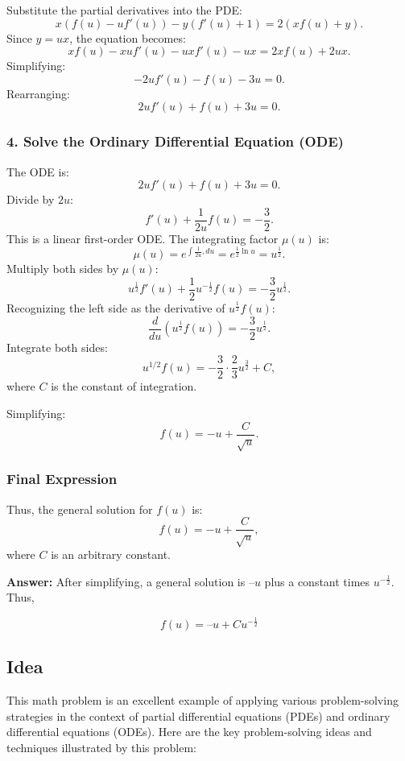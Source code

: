 \documentclass[a4paper,12pt]{book}
\begin{document}
Substitute the partial derivatives into the PDE:
\[
x \left( f(u) - u f'(u) \right) - y \left( f'(u) + 1 \right) = 2 \left( x f(u) + y \right).
\]
Since \( y = u x \), the equation becomes:
\[
x f(u) - x u f'(u) - u x f'(u) - u x = 2 x f(u) + 2 u x.
\]
Simplifying:
\[
-2u f'(u) - f(u) - 3u = 0.
\]
Rearranging:
\[
2u f'(u) + f(u) + 3u = 0.
\]

\subsubsection{4. Solve the Ordinary Differential Equation (ODE)}

The ODE is:
\[
2u f'(u) + f(u) + 3u = 0.
\]
Divide by \( 2u \):
\[
f'(u) + \frac{1}{2u} f(u) = -\frac{3}{2}.
\]
This is a linear first-order ODE. The integrating factor \( \mu(u) \) is:
\[
\mu(u) = e^{\int \frac{1}{2u} , du} = e^{\frac{1}{2} \ln u} = u^{\frac{1}{2}}.
\]
Multiply both sides by \( \mu(u) \):
\[
u^{\frac{1}{2}} f'(u) + \frac{1}{2} u^{-\frac{1}{2}} f(u) = -\frac{3}{2} u^{\frac{1}{2}}.
\]
Recognizing the left side as the derivative of \( u^{\frac{1}{2}} f(u) \):
\[
\frac{d}{du} \left( u^{\frac{1}{2}} f(u) \right) = -\frac{3}{2} u^{\frac{1}{2}}.
\]
Integrate both sides:
\[
u^{1/2} f(u) = -\frac{3}{2} \cdot \frac{2}{3} u^{\frac{3}{2}} + C,
\]
where \( C \) is the constant of integration.

Simplifying:
\[
f(u) = -u + \frac{C}{\sqrt{u}}.
\]

\subsubsection{Final Expression}

Thus, the general solution for \( f(u) \) is:
\[
f(u) = -u + \frac{C}{\sqrt{u}},
\]
where \( C \) is an arbitrary constant.

\textbf{Answer:} After simplifying, a general solution is \(–u\) plus a constant times \(u^{-\frac{1}{2}}\). Thus,

\[f(u) = – u + C u^{-\frac{1}{2}}\]

\subsection{Idea}

This math problem is an excellent example of applying various problem-solving strategies in the context of partial differential equations (PDEs) and ordinary differential equations (ODEs). Here are the key problem-solving ideas and techniques illustrated by this problem:
\end{document}
